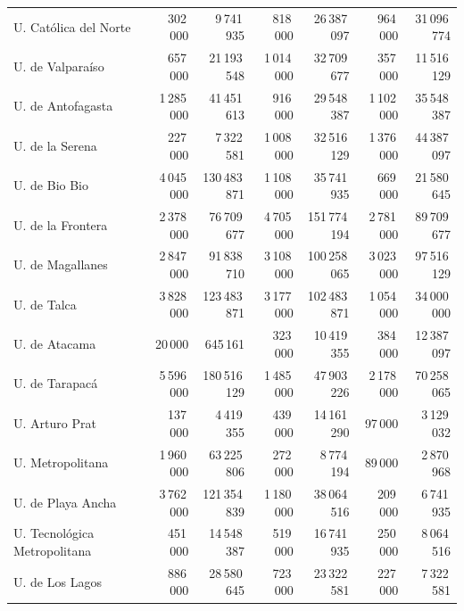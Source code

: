 \documentclass[twocolumn]{article}
\begin{document}
\begin{table}[t]
\begin{tabular}{l rr rr rr}
U. Católica del Norte          &     302\,000 &     9\,741\,935 &     818\,000 &    26\,387\,097 &     964\,000 &    31\,096\,774 \\
U. de Valparaíso               &     657\,000 &    21\,193\,548 &   1\,014\,000 &    32\,709\,677 &     357\,000 &    11\,516\,129 \\
U. de Antofagasta              &   1\,285\,000 &    41\,451\,613 &     916\,000 &    29\,548\,387 &   1\,102\,000 &    35\,548\,387 \\
U. de la Serena                &     227\,000 &     7\,322\,581 &   1\,008\,000 &    32\,516\,129 &   1\,376\,000 &    44\,387\,097 \\
U. de Bio Bio                  &   4\,045\,000 &   130\,483\,871 &   1\,108\,000 &    35\,741\,935 &     669\,000 &    21\,580\,645 \\
U. de la Frontera              &   2\,378\,000 &    76\,709\,677 &   4\,705\,000 &   151\,774\,194 &   2\,781\,000 &    89\,709\,677 \\
U. de Magallanes               &   2\,847\,000 &    91\,838\,710 &   3\,108\,000 &   100\,258\,065 &   3\,023\,000 &    97\,516\,129 \\
U. de Talca                    &   3\,828\,000 &   123\,483\,871 &   3\,177\,000 &   102\,483\,871 &   1\,054\,000 &    34\,000\,000 \\
U. de Atacama                  &      20\,000 &       645\,161 &     323\,000 &    10\,419\,355 &     384\,000 &    12\,387\,097 \\
U. de Tarapacá                 &   5\,596\,000 &   180\,516\,129 &   1\,485\,000 &    47\,903\,226 &   2\,178\,000 &    70\,258\,065 \\
U. Arturo Prat                 &     137\,000 &     4\,419\,355 &     439\,000 &    14\,161\,290 &      97\,000 &     3\,129\,032 \\
U. Metropolitana               &   1\,960\,000 &    63\,225\,806 &     272\,000 &     8\,774\,194 &      89\,000 &     2\,870\,968 \\
U. de Playa Ancha              &   3\,762\,000 &   121\,354\,839 &   1\,180\,000 &    38\,064\,516 &     209\,000 &     6\,741\,935 \\
U. Tecnológica Metropolitana   &     451\,000 &    14\,548\,387 &     519\,000 &    16\,741\,935 &     250\,000 &     8\,064\,516 \\
U. de Los Lagos                &     886\,000 &    28\,580\,645 &     723\,000 &    23\,322\,581 &     227\,000 &     7\,322\,581 \\

\end{tabular}
\end{table}
\end{document}
